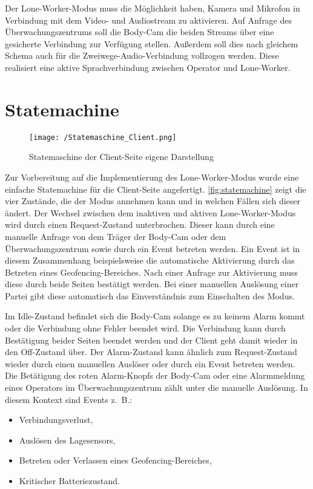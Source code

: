 \documentclass[thesis.tex]{subfiles}
\begin{document}
Der Lone-Worker-Modus muss die Möglichkeit haben, Kamera und Mikrofon in Verbindung mit dem Video- und Audiostream zu aktivieren.
Auf Anfrage des Überwachungszentrums soll die Body-Cam die beiden Streams über eine gesicherte Verbindung zur Verfügung stellen.
Außerdem soll dies nach gleichem Schema auch für die Zweiwege-Audio-Verbindung vollzogen werden.
Diese realisiert eine aktive Sprachverbindung zwischen Operator und Lone-Worker.


\section{Statemachine}

\begin{figure}[h]
    \centering
    \texttt{[image: /Statemaschine\_Client.png]}
    \caption[Statemaschine der Client-Seite]{Statemaschine der Client-Seite \lbrack eigene Darstellung\rbrack}
    \label{fig:statemachine}
\end{figure}

Zur Vorbereitung auf die Implementierung des Lone-Worker-Modus wurde eine einfache Statemachine für die Client-Seite angefertigt.
\autoref{fig:statemachine} zeigt die vier Zustände, die der Modus annehmen kann und in welchen Fällen sich dieser ändert.
Der Wechsel zwischen dem inaktiven und aktiven Lone-Worker-Modus wird durch einen Request-Zustand unterbrochen.
Dieser kann durch eine manuelle Anfrage von dem Träger der Body-Cam oder dem Überwachungszentrum sowie durch ein Event betreten werden.
Ein Event ist in diesem Zusammenhang beispielsweise die automatische Aktivierung durch das Betreten eines Geofencing-Bereiches.
Nach einer Anfrage zur Aktivierung muss diese durch beide Seiten bestätigt werden.
Bei einer manuellen Auslösung einer Partei gibt diese automatisch das Einverständnis zum Einschalten des Modus.

Im Idle-Zustand befindet sich die Body-Cam solange es zu keinem Alarm kommt oder die Verbindung ohne Fehler beendet wird.
Die Verbindung kann durch Bestätigung beider Seiten beendet werden und der Client geht damit wieder in den Off-Zustand über.
Der Alarm-Zustand kann ähnlich zum Request-Zustand wieder durch einen manuellen Auslöser oder durch ein Event betreten werden.
Die Betätigung des roten Alarm-Knopfs der Body-Cam oder eine Alarmmeldung eines Operators im Überwachungszentrum zählt unter die manuelle Auslösung.
In diesem Kontext sind Events z.~B.:
\begin{itemize}
    \item Verbindungsverlust,
    \item Auslösen des Lagesensors,
    \item Betreten oder Verlassen eines Geofencing-Bereiches,
    \item Kritischer Batteriezustand.
\end{itemize}
\end{document}
